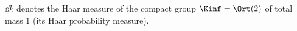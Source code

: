 $\dd k$ denotes the Haar measure of the compact group $\Kinf=\Ort(2)$ of total mass $1$ (its Haar probability measure).
